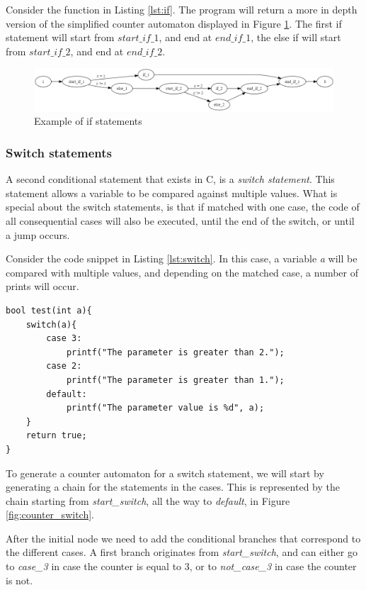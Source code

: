 \documentclass[12pt]{article}
\begin{document}
Consider the function in Listing \ref{lst:if}. The program will return a more in depth version of the simplified counter automaton displayed in Figure \ref{fig:test2_counter_automaton}. The first if statement will start from $start\_if\_1$, and end at $end\_if\_1$, the else if will start from $start\_if\_2$, and end at $end\_if\_2$.

\begin{figure}[h]
	\centering
	\includegraphics[width=\linewidth]{test2_counter_automaton}
	\caption{Example of if statements}
	\label{fig:test2_counter_automaton}
\end{figure}

\subsubsection{Switch statements}
A second conditional statement that exists in C, is a \textit{switch statement}. This statement allows a variable to be compared against multiple values. What is special about the switch statements, is that if matched with one case, the code of all consequential cases will also be executed, until the end of the switch, or until a jump occurs.

Consider the code snippet in Listing \ref{lst:switch}. In this case, a variable \textit{a} will be compared with multiple values, and depending on the matched case, a number of prints will occur.

\begin{lstlisting}[style=CStyle, caption={Example of a switch statement}, label={lst:switch}]
bool test(int a){
	switch(a){
		case 3:
			printf("The parameter is greater than 2.");
		case 2:
			printf("The parameter is greater than 1.");
		default:
			printf("The parameter value is %d", a);
	}
	return true;
}
\end{lstlisting}

To generate a counter automaton for a switch statement, we will start by generating a chain for the statements in the cases. This is represented by the chain starting from \textit{start\_switch}, all the way to \textit{default}, in Figure \ref{fig:counter_switch}.

After the initial node we need to add the conditional branches that correspond to the different cases. A first branch originates from \textit{start\_switch}, and can either go to \textit{case\_3} in case the counter is equal to 3, or to \textit{not\_case\_3} in case the counter is not.
\end{document}
